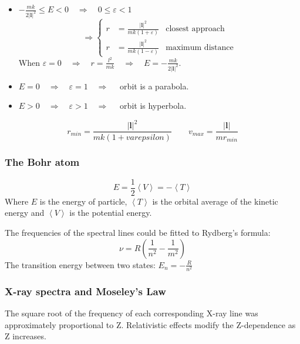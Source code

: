 \documentclass[a4paper,lang=cn,a4paper]{elegantpaper}
\newcommand{\vect}[1]{\boldsymbol{#1}}
\begin{document}
\begin{itemize}
    \item $-\frac{mk}{2|\vect{l}|^2}\leqslant E <0 \quad \Longrightarrow \quad 0\leqslant\varepsilon<1$
    \begin{equation*}
        \Longrightarrow \left\{
        \begin{aligned}
            r &= \frac{|\vect{l}|^2}{mk(1+\varepsilon)} &\text{closest approach}\\
            r &= \frac{|\vect{l}|^2}{mk(1-\varepsilon)} &\text{maximum distance}
        \end{aligned}\right.
    \end{equation*}
    When $\varepsilon = 0 \quad \Longrightarrow \quad r=\frac{l^2}{mk}\quad \Longrightarrow \quad E=-\frac{mk}{2|\vect{l}|^2}$.
    \item $E=0\quad \Longrightarrow \quad \varepsilon=1 \quad \Longrightarrow \quad$ orbit is a parabola.
    \item $E>0\quad \Longrightarrow \quad \varepsilon>1 \quad \Longrightarrow \quad$ orbit is hyperbola.
\end{itemize}
\begin{equation*}
    r_{min}=\frac{|\vect{l}|^2}{mk(1+varepsilon)} \qquad v_{max}=\frac{|\vect{l}|}{mr_{min}}
\end{equation*}

\subsubsection{The Bohr atom}
\begin{equation*}
    E = \frac{1}{2} \left\langle V\right\rangle = -\left\langle T\right\rangle
\end{equation*}
Where $E$ is the energy of particle, $\left\langle T \right\rangle$
is the orbital average of the kinetic energy and 
$\left\langle V\right\rangle$ is the potential energy.

The frequencies of the spectral lines could be fitted to Rydberg's 
formula: 
\begin{equation*}
    \nu = R\left(\frac{1}{n^2}-\frac{1}{m^2}\right)
\end{equation*}
The transition energy between two states: $E_n = -\frac{R}{n^2}$

\subsubsection{X-ray spectra and Moseley's Law}
The square root of the frequency of each corresponding X-ray line 
was approximately proportional to Z. Relativistic effects modify the 
Z-dependence as Z increases.
\end{document}
